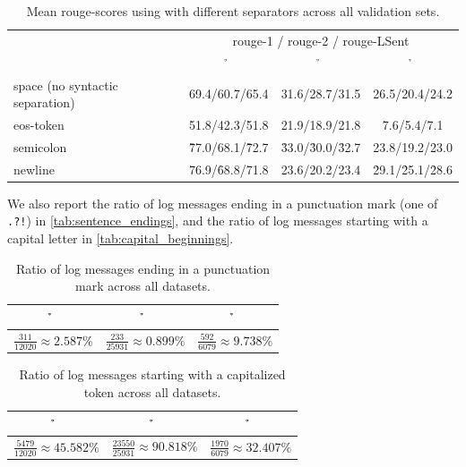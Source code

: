 \begin{table}[htbp]
\centering
\footnotesize
\begin{tabular}{lccc}
                                 & \multicolumn{3}{c}{\scriptsize{}\acs*{rouge}-1 / \acs*{rouge}-2 / \acs*{rouge}-LSent}\\
                                 & \h{\logsummary{}}          & \h{\hadoop{}}              & \h{\telco{}}\\
\midrule
space (no syntactic separation)  & 69.4/60.7/65.4             & 31.6/28.7/31.5             & 26.5/20.4/24.2\\
\acs{eos}-token                  & 51.8/42.3/51.8             & 21.9/18.9/21.8             & \phantom{0}7.6/\phantom{0}5.4/\phantom{0}7.1\\
semicolon                        & \h{77.0}/68.1/\h{72.7}     & \h{33.0}/\h{30.0}/\h{32.7} & 23.8/19.2/23.0\\
newline                          & 76.9/\h{68.8}/71.8         & 23.6/20.2/23.4             & \h{29.1}/\h{25.1}/\h{28.6}\\
\end{tabular}
\caption{Mean \acs*{rouge}-scores using  with different separators across all validation sets.}
\label{tab:separators_pegasus}
\end{table}

We also report the ratio of log messages ending in a punctuation mark (one of \verb+.?!+) in \autoref{tab:sentence_endings},
and the ratio of log messages starting with a capital letter in \autoref{tab:capital_beginnings}.

\begin{table}[htbp]
\centering
\footnotesize
\begin{tabular}{ccc}
\h{\logsummary{}}                     & \h{\hadoop{}}                         & \h{\telco{}}\\
\midrule
\(\frac{311}{12020} \approx 2.587\%\) & \(\frac{233}{25931} \approx 0.899\%\) & \(\frac{592}{6079} \approx 9.738\%\)
\end{tabular}
\caption{Ratio of log messages ending in a punctuation mark across all datasets.}
\label{tab:sentence_endings}
\end{table}

\begin{table}[htbp]
\centering
\footnotesize
\begin{tabular}{ccc}
\h{\logsummary{}}                       & \h{\hadoop{}}                            & \h{\telco{}}\\
\midrule
\(\frac{5479}{12020} \approx 45.582\%\) & \(\frac{23550}{25931} \approx 90.818\%\) & \(\frac{1970}{6079} \approx 32.407\%\)
\end{tabular}
\caption{Ratio of log messages starting with a capitalized token across all datasets.}
\label{tab:capital_beginnings}
\end{table}


